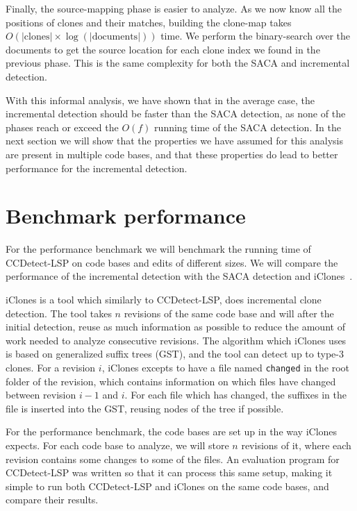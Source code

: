 Finally, the source-mapping phase is easier to analyze. As we now know all the positions
of clones and their matches, building the clone-map takes $O(\vert\text{clones}\vert
\times \log(\vert\text{documents}\vert))$ time. We perform the binary-search over the
documents to get the source location for each clone index we found in the previous phase.
This is the same complexity for both the SACA and incremental detection.

With this informal analysis, we have shown that in the average case, the incremental
detection should be faster than the SACA detection, as none of the phases reach or exceed
the $O(f)$ running time of the SACA detection. In the next section we will show that the
properties we have assumed for this analysis are present in multiple code bases, and that
these properties do lead to better performance for the incremental detection.

\section{Benchmark performance}

For the performance benchmark we will benchmark the running time of CCDetect-LSP on code
bases and edits of different sizes. We will compare the performance of the incremental
detection with the SACA detection and iClones~\cite{GodeIncrementalCloneDetection}.

iClones is a tool which similarly to CCDetect-LSP, does incremental clone detection. The
tool takes $n$ revisions of the same code base and will after the initial detection, reuse
as much information as possible to reduce the amount of work needed to analyze consecutive
revisions. The algorithm which iClones uses is based on generalized suffix trees (GST),
and the tool can detect up to type-3 clones. For a revision $i$, iClones excepts to have a
file named \verb|changed| in the root folder of the revision, which contains information
on which files have changed between revision $i - 1$ and $i$. For each file which has
changed, the suffixes in the file is inserted into the GST, reusing nodes of the tree if
possible.

For the performance benchmark, the code bases are set up in the way iClones expects. For
each code base to analyze, we will store $n$ revisions of it, where each revision contains
some changes to some of the files. An evaluation program for CCDetect-LSP was written so
that it can process this same setup, making it simple to run both CCDetect-LSP and iClones
on the same code bases, and compare their results.

